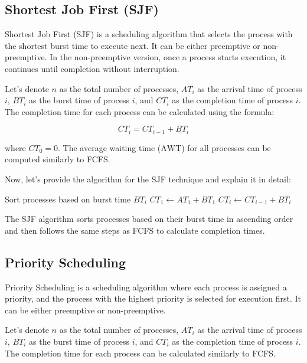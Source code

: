 \documentclass[12pt]{book} %
\begin{document}
\subsection{Shortest Job First (SJF)}

Shortest Job First (SJF) is a scheduling algorithm that selects the process with the shortest burst time to execute next. It can be either preemptive or non-preemptive. In the non-preemptive version, once a process starts execution, it continues until completion without interruption.

Let's denote $n$ as the total number of processes, $AT_i$ as the arrival time of process $i$, $BT_i$ as the burst time of process $i$, and $CT_i$ as the completion time of process $i$. The completion time for each process can be calculated using the formula:

\[
CT_i = CT_{i-1} + BT_i
\]

where $CT_0 = 0$. The average waiting time ($\text{AWT}$) for all processes can be computed similarly to FCFS.

Now, let's provide the algorithm for the SJF technique and explain it in detail:
\FloatBarrier
\begin{algorithm}[H]
\caption{Shortest Job First (SJF) Scheduling}
\begin{algorithmic}[1]
\State Sort processes based on burst time $BT_i$
\State $CT_1 \gets AT_1 + BT_1$
    \State $CT_i \gets CT_{i-1} + BT_i$
\EndFor
\end{algorithmic}
\end{algorithm}
\FloatBarrier
The SJF algorithm sorts processes based on their burst time in ascending order and then follows the same steps as FCFS to calculate completion times.

\subsection{Priority Scheduling}

Priority Scheduling is a scheduling algorithm where each process is assigned a priority, and the process with the highest priority is selected for execution first. It can be either preemptive or non-preemptive.

Let's denote $n$ as the total number of processes, $AT_i$ as the arrival time of process $i$, $BT_i$ as the burst time of process $i$, and $CT_i$ as the completion time of process $i$. The completion time for each process can be calculated similarly to FCFS.
\end{document}
